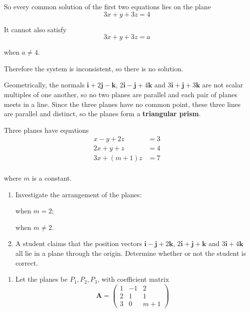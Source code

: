 \documentclass[leqno]{article}
\begin{document}
\begin{enumerate}[
  label=\textbf{\arabic*.},
  leftmargin=*,
  topsep=0pt,
  partopsep=0pt,
  parsep=0pt
]
\begin{djsSolution}
\begin{enumerate}[label=\textbf{(\alph*)}]
So every common solution of the first two equations lies on the plane
\[
3x+y+3z=4
\]

It cannot also satisfy
\[
3x+y+3z=a
\]

when $a\ne 4$.

Therefore the system is inconsistent, so there is no solution.

Geometrically, the normals $\mathbf{i}+2\mathbf{j}-\mathbf{k}$, $2\mathbf{i}-\mathbf{j}+4\mathbf{k}$ and $3\mathbf{i}+\mathbf{j}+3\mathbf{k}$ are not scalar multiples of one another, so no two planes are parallel and each pair of planes meets in a line. Since the three planes have no common point, these three lines are parallel and distinct, so the planes form a \textbf{triangular prism}.
\end{enumerate}
\end{djsSolution}


\newpage

\questionitem

Three planes have equations
\[
\begin{aligned}
x-y+2z&=3\\
2x+y+z&=4\\
3x+(m+1)z&=7
\end{aligned}
\] \\
where $m$ is a constant. \\
\begin{enumerate}[label=\textbf{(\alph*)}]
  \item Investigate the arrangement of the planes:

  when $m=2$;

  when $m\ne 2$.  \\
  \item A student claims that the position vectors $\mathbf{i}-\mathbf{j}+2\mathbf{k}$, $2\mathbf{i}+\mathbf{j}+\mathbf{k}$ and $3\mathbf{i}+4\mathbf{k}$ all lie in a plane through the origin. Determine whether or not the student is correct.  \\
\end{enumerate}

\vspace*{10pt}

\begin{djsSolution}
\begin{enumerate}[label=\textbf{(\alph*)}]
  \item Let the planes be \(P_1,P_2,P_3\), with coefficient matrix
\[
\mathbf{A}=\begin{pmatrix}
1 & -1 & 2\\
2 & 1 & 1\\
3 & 0 & m+1
\end{pmatrix}
\]


\end{enumerate}
\end{djsSolution}
\end{enumerate}
\end{document}
